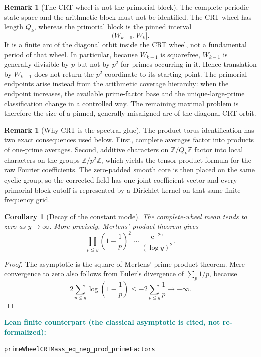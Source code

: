 \documentclass[11pt]{article}
\newtheorem{corollary}[theorem]{Corollary}
\theoremstyle{definition}
\newtheorem{remark}[theorem]{Remark}
\newcommand{\Z}{\mathbb Z}
\newcommand{\e}{\mathrm e}
\newcommand{\leanxref}[3]{%
  \par\smallskip
  {\small\noindent\textcolor{teal}{\textbf{#1:}}\par
  \noindent\href{#3}{\nolinkurl{#2}}\par}
  \smallskip
}
\begin{document}
\begin{remark}[The CRT wheel is not the primorial block]\label{rem:crt-not-block}
The complete periodic state space and the arithmetic block must not be identified.  The CRT wheel has length $Q_k$, whereas the primorial block is the pinned interval
\[
(W_{k-1},W_k].
\]
It is a finite arc of the diagonal orbit inside the CRT wheel, not a fundamental period of that wheel.  In particular, because $W_{k-1}$ is squarefree, $W_{k-1}$ is generally divisible by $p$ but not by $p^2$ for primes occurring in it.  Hence translation by $W_{k-1}$ does not return the $p^2$ coordinate to its starting point.  The primorial endpoints arise instead from the arithmetic coverage hierarchy: when the endpoint increases, the available prime-factor base and the unique-large-prime classification change in a controlled way.  The remaining maximal problem is therefore the size of a pinned, generally misaligned arc of the diagonal CRT orbit.
\end{remark}

\begin{remark}[Why CRT is the spectral glue]\label{rem:crt-spectral-glue}
The product-torus identification has two exact consequences used below.  First, complete averages factor into products of one-prime averages.  Second, additive characters on $\Z/Q_k\Z$ factor into local characters on the groups $\Z/p^2\Z$, which yields the tensor-product formula for the raw Fourier coefficients.  The zero-padded smooth core is then placed on the same cyclic group, so the corrected field has one joint coefficient vector and every primorial-block cutoff is represented by a Dirichlet kernel on that same finite frequency grid.
\end{remark}

\begin{corollary}[Decay of the constant mode]\label{cor:constant-decay}
The complete-wheel mean tends to zero as $y\to\infty$.
More precisely, Mertens' product theorem gives
\[
\prod_{p\le y}\left(1-\frac1p\right)^2
\sim \frac{\e^{-2\gamma}}{(\log y)^2}.
\]
\end{corollary}

\begin{proof}
The asymptotic is the square of Mertens' prime product theorem.  Mere convergence to zero also follows from Euler's divergence of $\sum_p1/p$, because
\[
2\sum_{p\le y}\log\left(1-\frac1p\right)
\le -2\sum_{p\le y}\frac1p\longrightarrow-\infty.
\]
\end{proof}
\leanxref{Lean finite counterpart (the classical asymptotic is cited, not re-formalized)}{primeWheelCRTMass_eq_neg_prod_primeFactors}{https://github.com/OVVO-Financial/prime-wheel-mobius/blob/main/formalization/RHLean/Analysis/PrimeWheelCompleteSpectrum.lean}
\end{document}
